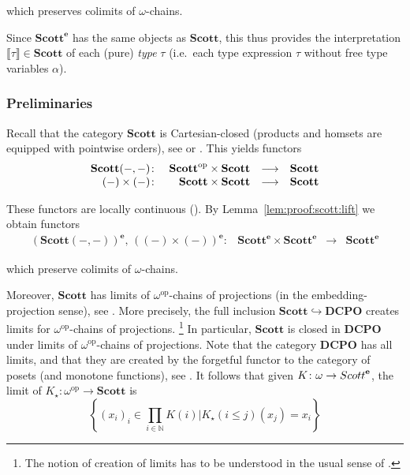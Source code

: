 \documentclass[%
  a4paper,
  UKenglish,
  cleveref,
  autoref,
  thm-restate,
  numberwithinsect,
]{lipics-v2021}
\newcommand\longto\longrightarrow
\newcommand\pl{\mathord{-}}	%
\newcommand\emb\hookrightarrow
\newcommand\NN{\mathbb{N}}
\newcommand\I[1]{\llbracket #1 \rrbracket} %
\newcommand\cat\mathcal
\newcommand\op{{\mathrm{op}}}
\newcommand\radj[1]{\ensuremath{{#1}_{\star}}}	%
\newcommand\DCPO{\mathbf{DCPO}}
\newcommand\Scott{\mathbf{Scott}}
\newcommand\TV{\alpha}		%
\newcommand\PT{\tau}		%
\newcommand\ep{{\mathbf{e}}}
\begin{document}
\noindent
which preserves colimits of $\omega$-chains.

Since $\Scott^\ep$ has the same objects as $\Scott$,
this thus provides the interpretation $\I\PT \in \Scott$
of each (pure) \emph{type} $\PT$
(i.e.\ each type expression $\PT$ without free type variables $\TV$).


\subsubsection{Preliminaries}
Recall that the category $\Scott$ is Cartesian-closed
(products and homsets are equipped with pointwise orders),
see \cite[Corollary 4.1.6]{aj95chapter} or \cite[\S 1.4]{ac98book}.
This yields functors
\[
\begin{array}{r r c l}
  \Scott(\pl,\pl) \colon
& \Scott^\op \times \Scott
& \longto
& \Scott
\\
%
  (\pl) \times (\pl) \colon
& \Scott \times \Scott
& \longto
& \Scott
\end{array}
\]

\noindent
These functors are locally continuous
(\cite[Example 7.1.16]{ac98book}).
By Lemma~\ref{lem:proof:scott:lift}
we obtain functors
\[
\begin{array}{*{4}{l}}
  \left(\Scott(\pl,\pl) \right)^\ep
  ,\,
  \left( (\pl) \times (\pl) \right)^\ep
  \colon
& \Scott^\ep \times \Scott^\ep
& \longto
& \Scott^\ep
\end{array}
\]

\noindent
which preserve colimits of $\omega$-chains.

Moreover, $\Scott$ has limits of $\omega^\op$-chains
of projections (in the embedding-projection sense),
see \cite[Theorem 3.3.7, Theorem 3.3.11 and Proposition 4.1.3]{aj95chapter}.
%
More precisely, the full inclusion $\Scott \emb \DCPO$
creates limits for $\omega^\op$-chains of projections.%
\footnote{The notion of creation of limits has to be understood in the usual
sense of \cite[Definition V.1]{maclane98book}.}
%
In particular, $\Scott$
is closed in $\DCPO$ under limits of $\omega^\op$-chains of projections.
%
Note that the category $\DCPO$ has all limits,
and that they are created by the forgetful functor to the category
of posets (and monotone functions),
see \cite[Theorem 3.3.1]{aj95chapter}.
%
It follows that given $K \colon \omega \to \cat \Scott^\ep$,
the limit of $\radj K \colon \omega^\op \to \Scott$
is
\[
  \left\{
  (x_i)_i \in \prod_{i \in \NN} K(i)
  \mathrel{\Big|}
  \radj K(i \leq j)(x_j) = x_i
  \right\}
\]
\end{document}
